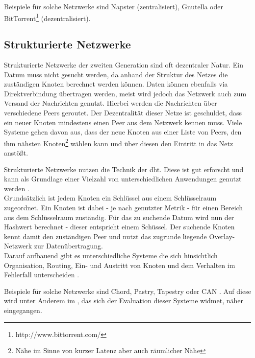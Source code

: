 Beispiele für solche Netzwerke sind Napster (zentralisiert), Gnutella oder BitTorrent\footnote{http://www.bittorrent.com/} (dezentralisiert).

\subsection{Strukturierte Netzwerke}
Strukturierte Netzwerke der zweiten Generation sind oft dezentraler Natur. Ein Datum muss nicht gesucht werden, da anhand der Struktur des Netzes die zuständigen Knoten berechnet werden können. Daten können ebenfalls via Direktverbindung übertragen werden, meist wird jedoch das Netzwerk auch zum Versand der Nachrichten genutzt. Hierbei werden die Nachrichten über verschiedene Peers geroutet. Der Dezentralität dieser Netze ist geschuldet, dass ein neuer Knoten mindestens einen Peer aus dem Netzwerk kennen muss. Viele Systeme gehen davon aus, dass der neue Knoten aus einer Liste von Peers, den ihm nähsten Knoten\footnote{Nähe im Sinne von kurzer Latenz aber auch räumlicher Nähe} wählen kann und über diesen den Eintritt in das Netz anstößt.

Strukturierte Netzwerke nutzen die Technik der \ac{dht}. Diese ist gut erforscht und kann als Grundlage einer Vielzahl von unterschiedlichen Anwendungen genutzt werden \cite{Wehrle2005, Ghodsi2006AlgorithmsDHT}.\\
Grundsätzlich ist jedem Knoten ein Schlüssel aus einem Schlüsselraum zugeordnet. Ein Knoten ist dabei - je nach genutzter Metrik - für einen Bereich aus dem Schlüsselraum zuständig. Für das zu suchende Datum wird nun der Hashwert berechnet - dieser entspricht einem Schüssel. Der suchende Knoten kennt damit den zuständigen Peer und nutzt das zugrunde liegende Overlay-Netzwerk zur Datenübertragung.\\
Darauf aufbauend gibt es unterschiedliche Systeme die sich hinsichtlich Organisation, Routing, Ein- und Austritt von Knoten und dem Verhalten im Fehlerfall unterscheiden \cite{Goetz2005, Lua2005Survey}.

Beispiele für solche Netzwerke sind Chord, Pastry, Tapestry oder CAN \cite{Hosseini2007Survey, Rowstron2001, Zhao2001Tapestry,Zhao2004Tapestry, Ratnasamy2001Scalable}. Auf diese wird unter Anderem im , das sich der Evaluation dieser Systeme widmet, näher eingegangen.

